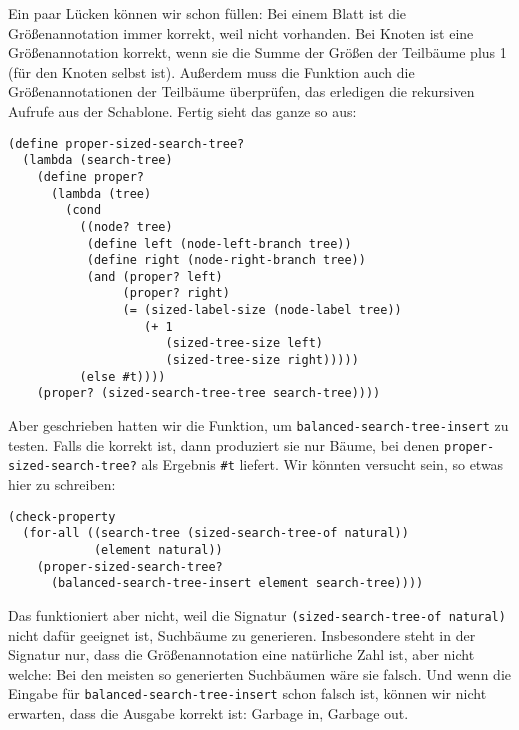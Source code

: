 %
Ein paar Lücken können wir schon füllen: Bei einem Blatt ist die
Größenannotation immer korrekt, weil nicht vorhanden.  Bei Knoten ist
eine Größenannotation korrekt, wenn sie die Summe der Größen der
Teilbäume plus 1 (für den Knoten selbst ist).  Außerdem muss die
Funktion auch die Größenannotationen der Teilbäume überprüfen, das
erledigen die rekursiven Aufrufe aus der Schablone.  Fertig sieht das
ganze so aus:
%
\begin{lstlisting}
(define proper-sized-search-tree?
  (lambda (search-tree)
    (define proper?
      (lambda (tree)
        (cond
          ((node? tree)
           (define left (node-left-branch tree))
           (define right (node-right-branch tree))
           (and (proper? left)
                (proper? right)
                (= (sized-label-size (node-label tree))
                   (+ 1
                      (sized-tree-size left)
                      (sized-tree-size right)))))
          (else #t))))
    (proper? (sized-search-tree-tree search-tree))))
\end{lstlisting}
% 
Aber geschrieben hatten wir die Funktion, um
\lstinline{balanced-search-tree-insert} zu testen.  Falls die korrekt
ist, dann produziert sie nur Bäume, bei denen
\lstinline{proper-sized-search-tree?} als Ergebnis \lstinline{#t}
liefert.  Wir könnten versucht sein, so etwas hier zu schreiben:

\begin{lstlisting}
(check-property
  (for-all ((search-tree (sized-search-tree-of natural))
            (element natural))
    (proper-sized-search-tree?
      (balanced-search-tree-insert element search-tree))))
\end{lstlisting}
%
Das funktioniert aber nicht, weil die Signatur
\lstinline{(sized-search-tree-of natural)} nicht dafür geeignet ist,
Suchbäume zu generieren.  Insbesondere steht in der
Signatur nur, dass die Größenannotation eine natürliche Zahl ist, aber
nicht welche: Bei den meisten so generierten Suchbäumen wäre sie
falsch.  Und wenn die Eingabe für
\lstinline{balanced-search-tree-insert} schon falsch ist, können wir
nicht erwarten, dass die Ausgabe korrekt ist: Garbage in, Garbage out.

